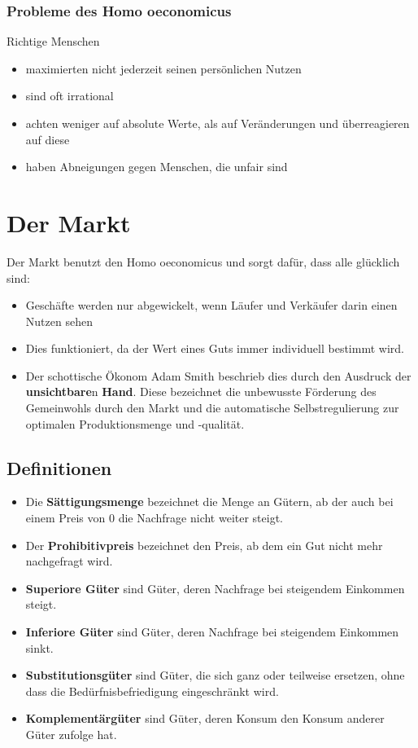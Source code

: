 \documentclass[titlepage,parskip=half]{scrartcl}
\let\Section\section
\renewcommand\section{\clearpage\Section}
\begin{document}
\subsubsection{Probleme des Homo oeconomicus}
Richtige Menschen
\begin{itemize}
    \item maximierten nicht jederzeit seinen persönlichen Nutzen
    \item sind oft irrational
    \item achten weniger auf absolute Werte, als auf Veränderungen und überreagieren auf diese
    \item haben Abneigungen gegen Menschen, die unfair sind
\end{itemize}


\section{Der Markt}

Der Markt benutzt den Homo oeconomicus und sorgt dafür, dass alle glücklich sind:
\begin{itemize}
    \item Geschäfte werden nur abgewickelt, wenn Läufer und Verkäufer darin einen Nutzen sehen
    \item Dies funktioniert, da der Wert eines Guts immer individuell bestimmt wird.
    \item Der schottische Ökonom Adam Smith beschrieb dies durch den Ausdruck der \textbf{unsichtbare}n \textbf{Hand}. Diese bezeichnet die unbewusste Förderung des Gemeinwohls durch den Markt und die automatische Selbstregulierung zur optimalen Produktionsmenge und -qualität.
\end{itemize}

\subsection{Definitionen}
\begin{itemize}
    \item Die \textbf{Sättigungsmenge} bezeichnet die Menge an Gütern, ab der auch bei einem Preis von 0 die Nachfrage nicht weiter steigt.
    \item Der \textbf{Prohibitivpreis} bezeichnet den Preis, ab dem ein Gut nicht mehr nachgefragt wird.
    \item \textbf{Superiore Güter} sind Güter, deren Nachfrage bei steigendem Einkommen steigt.
    \item \textbf{Inferiore Güter} sind Güter, deren Nachfrage bei steigendem Einkommen sinkt.
    \item \textbf{Substitutionsgüter} sind Güter, die sich ganz oder teilweise ersetzen, ohne dass die Bedürfnisbefriedigung eingeschränkt wird.
    \item \textbf{Komplementärgüter} sind Güter, deren Konsum den Konsum anderer Güter zufolge hat.
\end{itemize}
\end{document}
